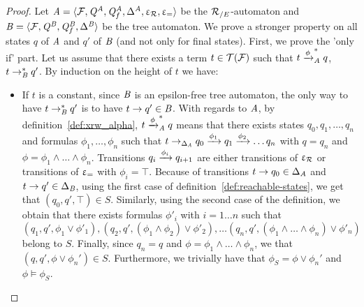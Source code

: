 \begin{proof}
  Let $\mathit A =\langle \mathcal{F}, \mathit Q^\mathit A,\mathit Q^\mathit A_f,\Delta^\mathit A, \upvarepsilon_{\mathcal R}, \upvarepsilon_{=} \rangle$
  be the ${\mathcal R_{/E}}$-automaton and $\mathit B=\langle \mathcal{F}, \mathit Q^\mathit B,\mathit Q^\mathit B_f,\Delta^\mathit B \rangle$ be
  the tree automaton.  
We prove a stronger property on all states $q$ of $\mathit A$ and $q'$ of $\mathit B$ (and not
only for final states).
First, we prove the 'only if' part. Let us assume that 
there exists a term $t\in\mathcal{T(F)}$ such that $t\xrightarrow{\phi}^*_\mathit A q$, $t \rightarrow_\mathit B^* q'$.
By induction on the height of $t$ we have:


\begin{itemize}
\item If $t$ is a constant, since $\mathit B$ is an epsilon-free tree automaton, the
  only way to have $t \rightarrow^*_\mathit B q'$ is to have $t \rightarrow q' \in \mathit B$. With regards to
  $\mathit A$, by definition~\ref{def:xrw_alpha}, $t\xrightarrow{\phi}^*_\mathit A q$ means that
  there exists states $q_0,q_1, \ldots, q_n$ and formulas $\phi_1,\ldots,
  \phi_n$ such that $t \rightarrow_{\Delta_\mathit A} q_0 \xrightarrow{\phi_1} q_1 \xrightarrow{\phi_2}
  \ldots q_n$ with $q=q_n$ and $\phi=\phi_1\wedge \ldots \wedge
  \phi_n$.%
  Transitions $q_i \xrightarrow{\phi_i} q_{i+1}$ are either transitions of $\upvarepsilon_{\mathcal R}$ or
  transitions of $\upvarepsilon_{=}$ with $\phi_i=\top$.  Because of transitions $t \rightarrow q_0
  \in \Delta_\mathit A$ and $t \rightarrow q' \in \Delta_\mathit B$, using the first case of
  definition~\ref{def:reachable-states}, we get that $(q_0,q',\top) \in
  S$. Similarly, using the second case of the definition, we obtain that there
  exists formulas $\phi'_i$ with $i=1\ldots n$ such that $(q_1,q', \phi_1\vee
  \phi'_1), (q_2,q',(\phi_1\wedge\phi_2)\vee \phi'_2),\ldots (q_n,q', (\phi_1
  \wedge \ldots \wedge \phi_n)\vee \phi'_n)$ belong to $S$. Finally, since
  $q_n=q$ and $\phi=\phi_1\wedge \ldots \wedge \phi_n$, we that
  $(q,q',\phi\vee\phi_n') \in S$. Furthermore, we trivially have that $\phi_S=
  \phi\vee \phi_n'$ and $\phi \models \phi_S$. %


\end{itemize}
\end{proof}
